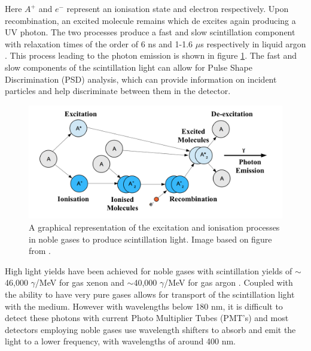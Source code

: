 Here $A^{+}$ and $e^{-}$ represent an ionisation state and electron respectively. Upon recombination, an excited molecule remains which de excites again producing a UV photon. The two processes produce a fast and slow scintillation component with relaxation times of the order of 6 ns and 1-1.6 $\mu$s respectively in liquid argon \cite{modesInternal}. This process leading to the photon emission is shown in figure \ref{fig:scintLightDiagram}. The fast and slow components of the scintillation light can allow for Pulse Shape Discrimination (PSD) analysis, which can provide information on incident particles and help discriminate between them in the detector.

\begin{figure}[htbp]
\begin{center}
\includegraphics[width=150mm]{Chapter1/figures/scintillationLight2.png}
\caption{A graphical representation of the excitation and ionisation processes in noble gases to produce scintillation light. Image based on figure from \cite{modesInternal}.}
\label{fig:scintLightDiagram}
\end{center}
\end{figure}

High light yields have been achieved for noble gases with scintillation yields of $\sim$46,000 $\gamma$/MeV for gas xenon and $\sim$40,000 $\gamma$/MeV for gas argon \cite{modesInternal}. Coupled with the ability to have very pure gases allows for transport of the scintillation light with the medium. However with wavelengths below 180 nm, it is difficult to detect these photons with current Photo Multiplier Tubes (PMT's) and most detectors employing noble gases use wavelength shifters to absorb and emit the light to a lower frequency, with wavelengths of around 400 nm.

